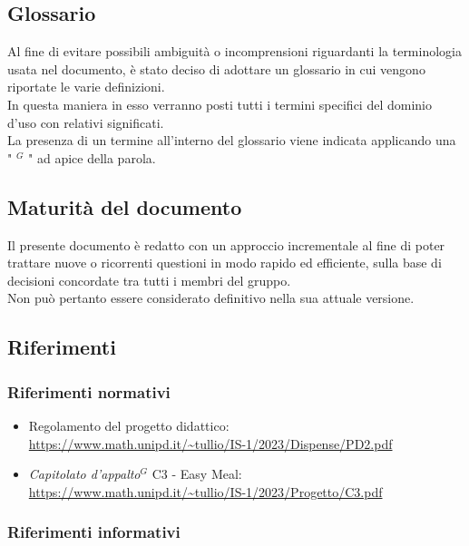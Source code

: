 \subsection{Glossario}

Al fine di evitare possibili ambiguità o incomprensioni riguardanti la terminologia usata nel documento, è stato deciso di adottare un glossario in cui vengono riportate le varie definizioni. \\
In questa maniera in esso verranno posti tutti i termini specifici del dominio d’uso con relativi significati. \\
La presenza di un termine all’interno del glossario viene indicata applicando una " $^{G}$ " ad apice della parola.


\subsection{Maturità del documento}

Il presente documento è redatto con un approccio incrementale al fine di poter trattare nuove o ricorrenti questioni in modo rapido ed efficiente, sulla base di decisioni concordate tra tutti i membri del gruppo. \\
Non può pertanto essere considerato definitivo nella sua attuale versione.

\subsection{Riferimenti}

\subsubsection{Riferimenti normativi}

\begin{itemize}
	\item Regolamento del progetto didattico: \\
	      \url{https://www.math.unipd.it/~tullio/IS-1/2023/Dispense/PD2.pdf}
	\item \emph{Capitolato d’appalto}$^{G}$ C3 - Easy Meal: \\
	      \url{https://www.math.unipd.it/~tullio/IS-1/2023/Progetto/C3.pdf}
\end{itemize}

\subsubsection{Riferimenti informativi}

